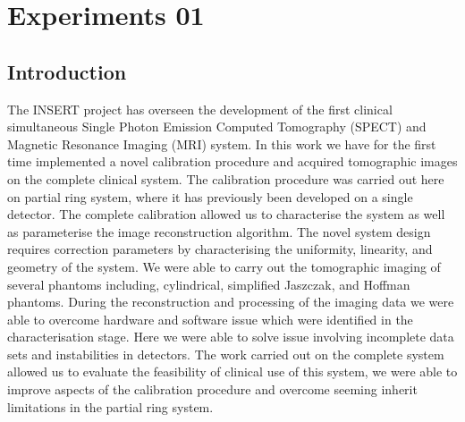 \chapter{Experiments 01}
\label{chapterlabel}



\section{Introduction}
The INSERT project has overseen the development
of the first clinical simultaneous Single Photon Emission Computed
Tomography (SPECT) and Magnetic Resonance Imaging
(MRI) system. In this work we have for the first time implemented
a novel calibration procedure and acquired tomographic images
on the complete clinical system. The calibration procedure was
carried out here on partial ring system, where it has previously
been developed on a single detector. The complete calibration
allowed us to characterise the system as well as parameterise
the image reconstruction algorithm. The novel system design
requires correction parameters by characterising the uniformity,
linearity, and geometry of the system. We were able to carry
out the tomographic imaging of several phantoms including,
cylindrical, simplified Jaszczak, and Hoffman phantoms. During
the reconstruction and processing of the imaging data we were
able to overcome hardware and software issue which were
identified in the characterisation stage. Here we were able to
solve issue involving incomplete data sets and instabilities in
detectors. The work carried out on the complete system allowed
us to evaluate the feasibility of clinical use of this system, we
were able to improve aspects of the calibration procedure and
overcome seeming inherit limitations in the partial ring system.

